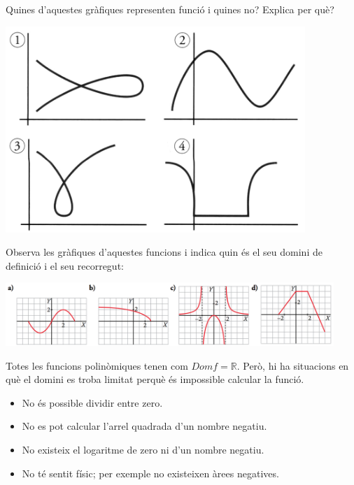 \begin{mylist}

\begin{minipage}[T]{0.58\textwidth}
	\exer Quines d'aquestes gràfiques representen funció i quines no? Explica per què?	
\end{minipage}
\begin{minipage}{0.38\textwidth}
	\noindent \includegraphics[width=0.85\textwidth]{img-05/fe-is-func}	
\end{minipage}

\exer \mental Observa les gràfiques d'aquestes funcions i indica quin és el seu domini de definició i el seu recorregut:	

\noindent \includegraphics[width=0.93\textwidth]{img-05/fe-dom-rec}	
\answers{[Dom $f=[-4,4]$, Dom $f=(-\infty,3)]$, Dom $f=(-\infty,-2)\cup(-2,2)\cup (2,+\infty)$ o també  Dom $f=\Re-\{-2,2\}$, Dom $f=[-2,5]$]}
\end{mylist}

\begin{theorybox}
	Totes les funcions polinòmiques tenen com $Dom f=\mathbb{R}$. Però, hi ha situacions en què el domini es troba limitat perquè és impossible calcular la funció.
	\begin{itemize}
		\item No és possible dividir entre zero.
		\item No es pot calcular l'arrel quadrada d'un nombre negatiu.
		\item No existeix el logaritme de zero ni d'un nombre negatiu.
		\item No té sentit físic; per exemple no existeixen àrees negatives.
	\end{itemize}
\end{theorybox}

